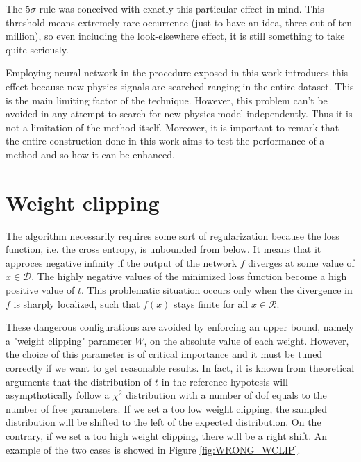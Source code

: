 The $5\sigma$ rule was conceived with exactly this particular effect in mind. This threshold means extremely rare occurrence (just to have an idea, three out of ten million), so even including the look-elsewhere effect, it is still something to take quite seriously.

Employing neural network in the procedure exposed in this work introduces this effect because new physics signals are searched ranging in the entire dataset. This is the main limiting factor of the technique. However, this problem can't be avoided in any attempt to search for new physics model-independently. Thus it is not a limitation of the method itself. Moreover, it is important to remark that the entire construction done in this work aims to test the performance of a method and so how it can be enhanced.





\section{Weight clipping}
The algorithm necessarily requires some sort of regularization because the loss function, i.e. the cross entropy, is unbounded from below. It means that it approces negative infinity if the output of the network $f$ diverges at some value of $x \in \mathcal{D}$. The highly negative values of the minimized loss function become a high positive value of $t$. This problematic situation occurs only when the divergence in $f$ is sharply localized, such that $f(x)$ stays finite for all $x \in \mathcal{R}$.

These dangerous configurations are avoided by enforcing an upper bound, namely a "weight clipping" parameter $W$, on the absolute value of each weight. However, the choice of this parameter is of critical importance and it must be tuned correctly if we want to get reasonable results. In fact, it is known from theoretical arguments that the distribution of $t$ in the reference hypotesis will asympthotically follow a $\chi^2$ distribution with a number of dof equals to the number of free parameters. If we set a too low weight clipping, the sampled distribution will be shifted to the left of the expected distribution. On the contrary, if we set a too high weight clipping, there will be a right shift. An example of the two cases is showed in Figure \ref{fig:WRONG_WCLIP}.

